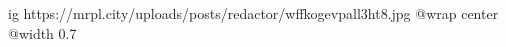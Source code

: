  
 
 
 
 

\ifcmt
  ig https://mrpl.city/uploads/posts/redactor/wffkogevpall3ht8.jpg
  @wrap center
  @width 0.7
\fi
